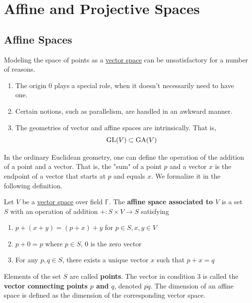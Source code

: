 \section{Affine and Projective Spaces}

\subsection{Affine Spaces}

  Modeling the space of points as a \hyperref[def:vector-space]{vector space} can be unsatisfactory for a number of reasons. 
  \begin{enumerate}
    \item The origin $0$ plays a special role, when it doesn't necessarily need to have one. 
    \item Certain notions, such as parallelism, are handled in an awkward manner. 
    \item The geometries of vector and affine spaces are intrinsically. That is, 
      \begin{equation}
        \operatorname{GL}(V) \subset \operatorname{GA}(V)
      \end{equation}
  \end{enumerate}

  In the ordinary Euclidean geometry, one can define the operation of the addition of a point and a vector. That is, the "sum" of a point $p$ and a vector $x$ is the endpoint of a vector that starts at $p$ and equals $x$. We formalize it in the following definition. 

  \begin{definition}
    \label{def:affine-space-associated-to-v}
    Let $V$ be a \hyperref[def:vector-space]{vector space} over field $\mathbb{F}$. The \textbf{affine space associated to $V$} is a set $S$ with an operation of addition $+: S \times V \to S$ satisfying 
    \begin{enumerate}
      \item $p + (x + y) = (p + x) + y$ for $p \in S, x, y \in V$
      \item $p + 0 = p$ where $p \in S$, $0$ is the zero vector 
      \item For any $p, q \in S$, there exists a unique vector $x$ such that $p + x = q$
    \end{enumerate}
    Elements of the set $S$ are called \textbf{points}. The vector in condition 3 is called the \textbf{vector connecting points $p$ and $q$}, denoted $\overline{pq}$. The dimension of an affine space is defined as the dimension of the corresponding vector space. 
  \end{definition}

